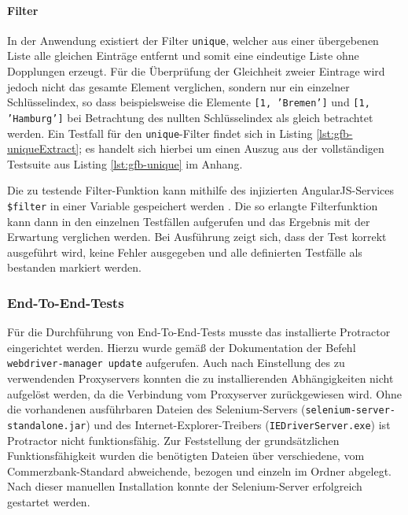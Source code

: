 \paragraph{Filter}
In der Anwendung existiert der Filter \texttt{unique}, welcher aus einer übergebenen Liste alle gleichen Einträge entfernt und somit eine eindeutige Liste ohne Dopplungen erzeugt. Für die Überprüfung der Gleichheit zweier Eintrage wird jedoch nicht das gesamte Element verglichen, sondern nur ein einzelner Schlüsselindex, so dass beispielsweise die Elemente \texttt{[1, 'Bremen']} und \texttt{[1, 'Hamburg']} bei Betrachtung des nullten Schlüsselindex als gleich betrachtet werden. Ein Testfall für den \texttt{unique}-Filter findet sich in Listing \ref{lst:gfb-uniqueExtract}; es handelt sich hierbei um einen Auszug aus der vollständigen Testsuite aus Listing \ref{lst:gfb-unique} im Anhang.

\begin{figure}[H]
	
\end{figure}

Die zu testende Filter-Funktion kann mithilfe des injizierten AngularJS-Services \texttt{\$filter} in einer Variable gespeichert werden \cite{angular-filter}. Die so erlangte Filterfunktion kann dann in den einzelnen Testfällen aufgerufen und das Ergebnis mit der Erwartung verglichen werden. Bei Ausführung zeigt sich, dass der Test korrekt ausgeführt wird, keine Fehler ausgegeben und alle definierten Testfälle als bestanden markiert werden.

\subsubsection{End-To-End-Tests}
Für die Durchführung von End-To-End-Tests musste das installierte Protractor eingerichtet werden. Hierzu wurde gemäß der Dokumentation \cite{protractor-index} der Befehl \texttt{webdriver-manager update} aufgerufen. Auch nach Einstellung des zu verwendenden Proxyservers konnten die zu installierenden Abhängigkeiten nicht aufgelöst werden, da die Verbindung vom Proxyserver zurückgewiesen wird. Ohne die vorhandenen ausführbaren Dateien des Selenium-Servers (\texttt{selenium-server-standalone.jar}) und des Internet-Explorer-Treibers (\texttt{IEDriverServer.exe}) ist Protractor nicht funktionsfähig. Zur Feststellung der grundsätzlichen Funktionsfähigkeit wurden die benötigten Dateien über verschiedene, vom Commerzbank-Standard abweichende, bezogen und einzeln im Ordner abgelegt. Nach dieser manuellen Installation konnte der Selenium-Server erfolgreich gestartet werden. 

